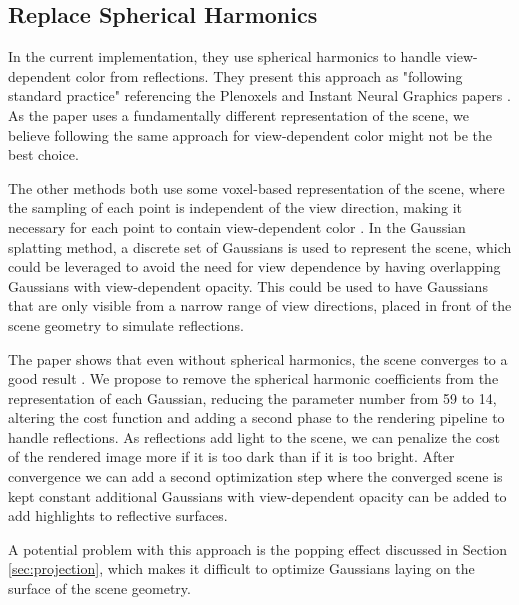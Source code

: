 \subsection{Replace Spherical Harmonics}
\label{sec:spherical_harmonics}
In the current implementation, they use spherical harmonics to handle view-dependent color from reflections.
They present this approach as "following standard practice" referencing the Plenoxels and Instant Neural Graphics papers \cite{yuPlenoxelsRadianceFields2021a}\cite{mullerInstantNeuralGraphics2022}.
As the paper uses a fundamentally different representation of the scene, we believe following the same approach for view-dependent color might not be the best choice.

The other methods both use some voxel-based representation of the scene,
where the sampling of each point is independent of the view direction,
making it necessary for each point to contain view-dependent color \cite{yuPlenoxelsRadianceFields2021a}\cite{mullerInstantNeuralGraphics2022}.
In the Gaussian splatting method, a discrete set of Gaussians is used to represent the scene, which could be leveraged to avoid the need for view dependence by having overlapping Gaussians with view-dependent opacity.
This could be used to have Gaussians that are only visible from a narrow range of view directions, placed in front of the scene geometry to simulate reflections.

The paper shows that even without spherical harmonics, the scene converges to a good result \cite[Table 3]{kerbl3DGaussianSplatting2023}.
We propose to remove the spherical harmonic coefficients from the representation of each Gaussian, reducing the parameter number from 59 to 14, altering the cost function and adding a second phase to the rendering pipeline to handle reflections.
As reflections add light to the scene, we can penalize the cost of the rendered image more if it is too dark than if it is too bright.
After convergence we can add a second optimization step where the converged scene is kept constant additional Gaussians with view-dependent opacity can be added to add highlights to reflective surfaces.

A potential problem with this approach is the popping effect discussed in Section \ref{sec:projection}, which makes it difficult to optimize Gaussians laying on the surface of the scene geometry.